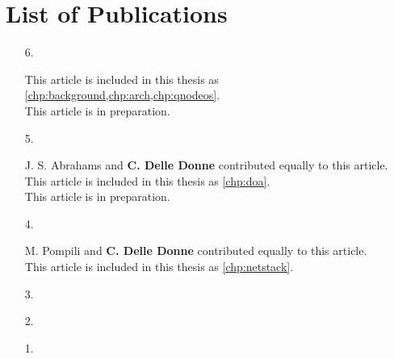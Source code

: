 \chapter*{List of Publications}

\def\aicon{\makebox[1.25em][l]{\footnotesize \faUser}}
\def\ficon{\makebox[1.25em][l]{\footnotesize \faFileTextO}}
\def\picon{\makebox[1.25em][l]{\footnotesize \faPencilSquareO}}

\begin{enumerate}[label={\arabic*.},itemsep=0.7\baselineskip,parsep=0.3\baselineskip]
    \item[6.] 
        \par\ficon This article is included in this thesis as \cref{chp:background,chp:arch,chp:qnodeos}.
        \\ \picon This article is in preparation.
    \item[5.] 
        \par\aicon J. S. Abrahams and \textbf{C. Delle Donne} contributed equally to this article.
        \\ \ficon This article is included in this thesis as \cref{chp:doa}.
        \\ \picon This article is in preparation.
    \item[4.] 
        \par\aicon M. Pompili and \textbf{C. Delle Donne} contributed equally to this article.
        \\ \ficon This article is included in this thesis as \cref{chp:netstack}.
    \item[3.] 
    \item[2.] 
    \item[1.] 
\end{enumerate}

\begin{xstretch}
\printbibliography[heading=subbibintoc,title={References},notcategory=noprint]
\end{xstretch}
